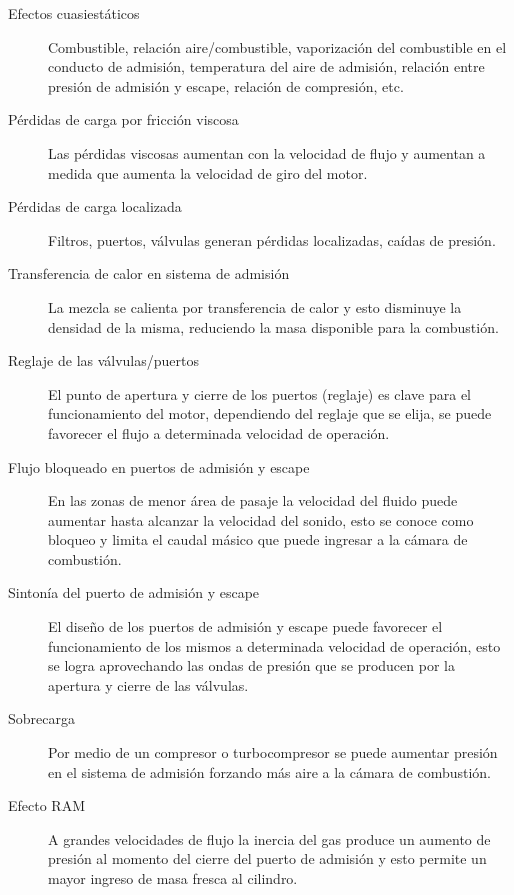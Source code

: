 \begin{description}
    \item [Efectos cuasiestáticos] Combustible, relación aire/combustible,
vaporización del combustible en el conducto de admisión, temperatura del aire de
admisión, relación entre presión de admisión y escape, relación de compresión,
etc.
  \item [Pérdidas de carga por fricción viscosa] Las pérdidas viscosas aumentan
con la velocidad de flujo y aumentan a medida que aumenta la velocidad de giro
del motor.
  \item [Pérdidas de carga localizada] Filtros, puertos, válvulas generan
pérdidas localizadas, caídas de presión.
  \item [Transferencia de calor en sistema de admisión] La mezcla se calienta
por transferencia de calor y esto disminuye la densidad de la misma, reduciendo
la masa disponible para la combustión.
  \item [Reglaje de las válvulas/puertos] El punto de apertura y cierre de los
puertos (reglaje) es clave para el funcionamiento del motor, dependiendo del
reglaje que se elija, se puede favorecer el flujo a determinada velocidad de
operación.
    \item [Flujo bloqueado en puertos de admisión y escape] En las zonas de
menor área de pasaje la velocidad del fluido puede aumentar hasta alcanzar la
velocidad del sonido, esto se conoce como bloqueo y limita el caudal másico que
puede ingresar a la cámara de combustión.
    \item [Sintonía del puerto de admisión y escape] El diseño de los puertos de
admisión y escape puede favorecer el funcionamiento de los mismos a determinada
velocidad de operación, esto se logra aprovechando las ondas de presión que se
producen por la apertura y cierre de las válvulas.
  \item [Sobrecarga] Por medio de un compresor o turbocompresor se puede
aumentar presión en el sistema de admisión forzando más aire a la cámara de
combustión.
    \item [Efecto RAM] A grandes velocidades de flujo la inercia del gas produce
un aumento de presión al momento del cierre del puerto de admisión y esto
permite un mayor ingreso de masa fresca al cilindro.
\end{description}

